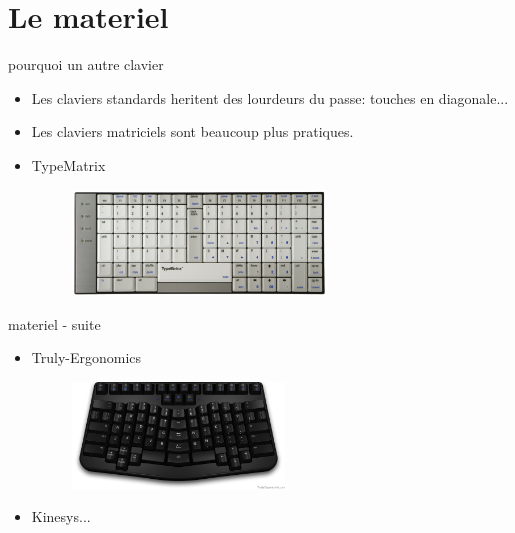 \section{Le materiel}
\begin{frame}{pourquoi un autre clavier}
    \begin{itemize}
	\item Les claviers standards heritent des lourdeurs du passe: touches en diagonale...
	\item Les claviers matriciels sont beaucoup plus pratiques.
	\pause
	\item TypeMatrix\\
	\begin{figure}
	\centering
	\includegraphics[height=80pt]{images/2030-dvorak.png}
	\end{figure}
    \end{itemize}
\end{frame}
\begin{frame}{materiel - suite}
    \begin{itemize}
	\item Truly-Ergonomics\\
	\begin{figure}
	\centering
	\includegraphics[height=80pt]{images/t_e_keyboard.jpg}
	\end{figure}
	\item Kinesys...
    \end{itemize}
\end{frame}
